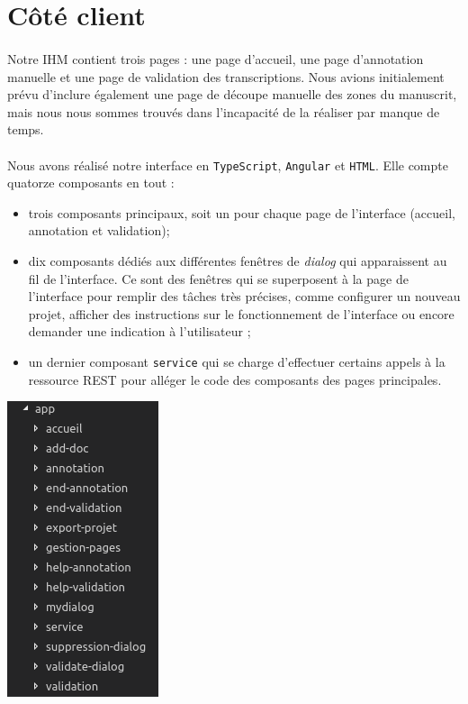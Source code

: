 \section{Côté client}
\paragraph{}
Notre IHM contient trois pages : une page d'accueil, une page d'annotation manuelle et une page de validation des transcriptions. Nous avions initialement prévu d'inclure également une page de découpe manuelle des zones du manuscrit, mais nous nous sommes trouvés dans l'incapacité de la réaliser par manque de temps.

\paragraph{}
Nous avons réalisé notre interface en \texttt{TypeScript}, \texttt{Angular} et \texttt{HTML}. Elle compte quatorze composants en tout :
\begin{itemize}
\item trois composants principaux, soit un pour chaque page de l'interface (accueil, annotation et validation);
\item dix composants dédiés aux différentes fenêtres de \textit{dialog} qui apparaissent au fil de l'interface. Ce sont des fenêtres qui se superposent à la page de l'interface pour remplir des tâches très précises, comme configurer un nouveau projet, afficher des instructions sur le fonctionnement de l'interface ou encore demander une indication à l'utilisateur ;
\item un dernier composant \texttt{service} qui se charge d'effectuer certains appels à la ressource REST pour alléger le code des composants des pages principales.
\end{itemize}

\begin{mdframed}[frametitle={Figure 5 : Arborescence des composants de l'interface}, innerbottommargin=10]
\begin{center}
\includegraphics[scale=0.5]{assets/arborescenceIHM.png}
\end{center}
\end{mdframed}

